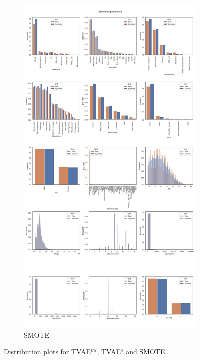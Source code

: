 \begin{landscape}
\begin{figure}[h]
\begin{subfigure}{0.3\linewidth}
			\includegraphics[height=\textheight,width=\linewidth,keepaspectratio]{images/distributions_full/smote.jpg}
			\caption{SMOTE}
		\end{subfigure}
		\caption{Distribution plots for TVAE$^{ml}$, TVAE$^s$ and SMOTE}
		\label{fig_a:dist_2}
	\end{figure}
\end{landscape}

